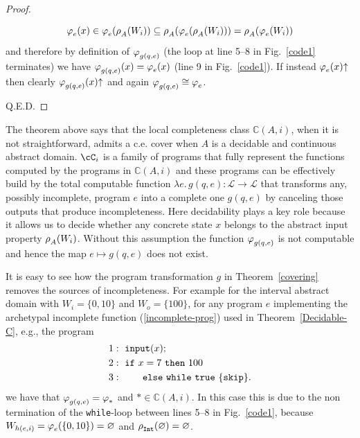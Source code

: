 \documentclass[runningheads]{llncs}
\def\ok#1{\mbox{\raisebox{0ex}[1ex][1ex]{$#1$}}}
\def\re{c.e.}
\newcommand{\myqed}{\textsc{Q.E.D.}}
\def\bbbc{{\mathbb{C}}}
\newcommand{\ccL}{\mathscr{L}}
\newcommand{\pfunction}[3]{\ok{\varphi^{#2\, #3}_{#1}}}
\newcommand{\auco}[2]{\ok{\rho^{#1}_{#2}}}
\newcommand{\ra}{\rightarrow}
\def\ok#1{\mbox{\raisebox{0ex}[1ex][1ex]{$#1$}}}
\def\cAA{\ensuremath{A}}
\begin{document}
\begin{proof}
\begin{enumerate}
        \[
        \pfunction{e}{}{}(x)\in\pfunction{e}{}{}(\auco{}{\cAA}(W_{i}))
        \subseteq \auco{}{\cAA}(\pfunction{e}{}{}(\auco{}{\cAA}(W_{i})))=
        \auco{}{\cAA}(\pfunction{e}{}{}(W_{i}))
        \]
        and therefore by definition of $\pfunction{g(q,e)}{}{}$ (the loop at line 5--8 in Fig.~\ref{code1} terminates) we have $\pfunction{g(q,e)}{}{}(x)=\pfunction{e}{}{}(x)$ (line 9 in Fig.~\ref{code1}). If instead $\pfunction{e}{}{}(x){\uparrow}$ then clearly 
        $\pfunction{g(q,e)}{}{}(x){\uparrow}$ and again $\pfunction{g(q,e)}{}{}\cong\pfunction{e}{}{}$.
    \end{enumerate}
    \myqed
\end{proof}

The theorem above says that the local completeness class $\bbbc(\cAA,i)$, when it is not straightforward, admits a {\re} cover when $\cAA$ is a decidable and continuous abstract domain. $\cC_i$ is a family of programs that fully represent the functions computed by the programs in $\bbbc(\cAA,i)$ and these programs can be effectively build by the total computable function $\lambda e.\,g(q,e):\ccL\ra\ccL$ that transforms any, possibly incomplete, program $e$ into a complete one $g(q,e)$ by canceling those outputs that produce incompleteness. Here decidability plays a key role because it allows us to decide whether any concrete state $x$ belongs to the abstract input property $\auco{}{\cAA}(W_i)$. Without this assumption the function $\pfunction{g(q,e)}{}{}$ is not computable and hence the map $e\mapsto g(q,e)$ does not exist.

\begin{example}
    It is easy to see how the program transformation $g$ in Theorem~\ref{covering} removes the sources of incompleteness. For example for the interval abstract domain with $W_i=\{0,10\}$ and $W_o=\{100\}$, for any program $e$ implementing the archetypal incomplete function (\ref{incomplete-prog}) used in Theorem~\ref{Decidable-C}, e.g.,
    the program 
     \begin{align*}
    &1:~{\tt input}(x);\\
    &2:~{\tt if}\ x = 7\ {\tt then}\ 100\\
    &3:~\qquad\! {\tt else}\ {\tt while}\ {\tt true}\ \{{\tt skip}\}.
    \end{align*}
    we have that $\pfunction{g(q,e)}{}{}=\pfunction{*}{}{}$ and $*\in\bbbc(\cAA,i)$. In this case this is due to the non termination of the {\tt while}-loop between lines 5--8 in Fig.~\ref{code1}, because $W_{h(e,i)}=\pfunction{e}{}{}(\{0,10\})=\varnothing$ and $\auco{}{{\tt Int}}(\varnothing)=\varnothing$.
\end{example}
\end{document}
